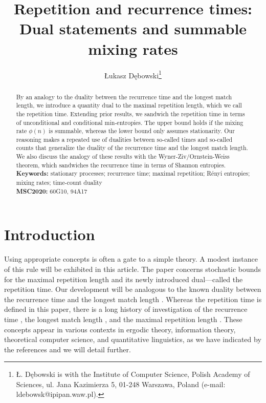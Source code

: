 \documentclass[a4paper,12pt]{article}
\author{{\L}ukasz D\k{e}bowski\thanks{
    {\L}. D\k{e}bowski is with
    the Institute of Computer Science, Polish Academy of Sciences, 
    ul. Jana Kazimierza 5, 01-248 Warszawa, Poland 
    (e-mail: ldebowsk@ipipan.waw.pl).
  }
}
\title{Repetition and recurrence times: \\ Dual statements and
  summable mixing rates} \date{}
\begin{document}
\begin{titlepage}
\maketitle

\begin{abstract}
  By an analogy to the duality between the recurrence time and
  the longest match length, we introduce a quantity dual to the
  maximal repetition length, which we call the repetition time.
  Extending prior results, we sandwich the repetition time in terms of
  unconditional and conditional min-entropies. The upper bound holds
  if the mixing rate $\phi(n)$ is summable, whereas the lower bound
  only assumes stationarity.  Our reasoning makes a repeated use of
  dualities between so-called times and so-called counts that
  generalize the duality of the recurrence time and the longest match
  length.  We also discuss the analogy of these results with the
  Wyner-Ziv/Ornstein-Weiss theorem, which sandwiches the recurrence
  time in terms of Shannon entropies.
%
  \\[1em]
  \textbf{Keywords:} stationary processes; recurrence time; maximal
  repetition; R\'enyi entropies; mixing rates; time-count
  duality
  \\[1em]
  \textbf{MSC2020:} 60G10, 94A17
\end{abstract}


\end{titlepage}

\section{Introduction}
\label{secIntroduction}

Using appropriate concepts is often a gate to a simple theory. A
modest instance of this rule will be exhibited in this article. The
paper concerns stochastic bounds for the maximal repetition length and
its newly introduced dual---called the repetition time.  Our
development will be analogous to the known duality between the
recurrence time and the longest match length \cite{WynerZiv89}.
Whereas the repetition time is defined in this paper, there is a long
history of investigation of the recurrence time
\cite{Kac47,WynerZiv89,OrnsteinWeiss93,Kontoyiannis98,Ko12}, the
longest match length \cite{WynerZiv89,OrnsteinWeiss93,Szpankowski93,
  KontoyiannisOther98,GaoKontoyiannisBienenstock08}, and the maximal
repetition length
\cite{DeLuca99,KolpakovKucherov99a,KolpakovKucherov99,CrochemoreIlie08,
  ErdosRenyi70,ArratiaWaterman89,Shields92b,Shields97,
  Szpankowski93,Szpankowski93a,KontoyiannisSuhov94,
  Debowski11b,Debowski17,Debowski18b}. These concepts appear in
various contexts in ergodic theory, information theory, theoretical
computer science, and quantitative linguistics, as we have indicated
by the references and we will detail further.
\end{document}
